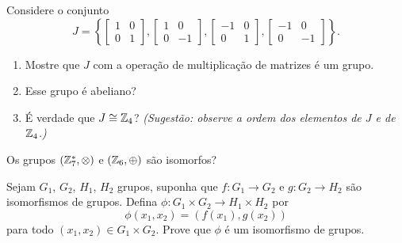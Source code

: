 \documentclass[12pt]{exam}
\begin{document}
    \questao{} Considere o conjunto
    \[
      J = \left\{\begin{bmatrix}
        1 & 0\\0 & 1
      \end{bmatrix}, \begin{bmatrix}
        1 & 0\\0 & -1
      \end{bmatrix}, \begin{bmatrix}
        -1 & 0\\0 & 1
      \end{bmatrix}, \begin{bmatrix}
        -1 & 0\\0 & -1
      \end{bmatrix}\right\}.
    \]
    \begin{enumerate}[label=({\alph*})]
      \item Mostre que $J$ com a opera\c{c}\~ao de multiplica\c{c}\~ao de matrizes \'e um grupo.

      \item Esse grupo \'e abeliano?

      \item É verdade que $J \cong \mathbb{Z}_4$? \textit{(Sugestão: observe a ordem dos elementos de $J$ e de $\mathbb{Z}_4$.)}
    \end{enumerate}

    \vspace{.3cm}

    \questao{} Os grupos $(\mathbb{Z}_7^*, \otimes)$ e $(\mathbb{Z}_6, \oplus)$ s\~ao isomorfos?

    \vspace{.3cm}

    \questao{} Sejam $G_1$, $G_2$, $H_1$, $H_2$ grupos, suponha que $f : G_1 \to G_2$ e $g : G_2 \to H_2$ são isomorfismos de grupos. Defina $\phi : G_1 \times G_2 \to H_1 \times H_2$ por
    \[
        \phi(x_1, x_2) = (f(x_1), g(x_2))
    \]
    para todo $(x_1, x_2) \in G_1 \times G_2$. Prove que $\phi$ é um isomorfismo de grupos.
\end{document}
